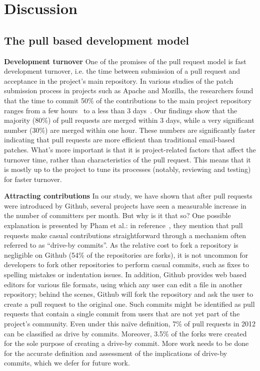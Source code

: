 \documentclass{acm_proc_article-sp}
\begin{document}

\section{Discussion}
\label{sec:discussion}

\subsection{The pull based development model}

\textbf{Development turnover} One of the promises of the pull request model
is fast development turnover, i.e. the time between submission of a pull
request and acceptance in the project's main repository. In various studies of
the patch submission process in projects such as Apache and Mozilla, the
researchers found that the time to commit 50\% of the contributions to the main
project repository ranges from a few hours~\cite{Rigby08} to a less than 3
days~\cite{Weiss08, Baysa12}. Our findings show that the majority (80\%) of
pull requests are merged within 3 days, while a very significant number (30\%)
are merged within one hour. These numbers are significantly faster indicating
that pull requests are more efficient than traditional email-based patches.
What's more important is that it is project-related factors that affect the
turnover time, rather than characteristics of the pull request. This means that
it is mostly up to the project to tune its processes (notably, reviewing and
testing) for faster turnover. 

\textbf{Attracting contributions}
In our study, we have shown that after pull requests were introduced
by Github, several projects have seen a measurable increase in the number
of committers per month. But why is it that so? One possible explanation
is presented by Pham et al.: in reference~\cite{Pham13}, they mention
that pull requests make casual contributions straightforward through
a mechanism often referred to as ``drive-by commits''. As the
relative cost to fork a repository is negligible on Github (54\% of the
repositories are forks), it is not uncommon for developers to fork other
repositories to perform casual commits, such as fixes to spelling mistakes or
indentation issues. In addition, Github provides web based editors
for various file formats, using which any user can edit a file in another
repository; behind the scenes, Github will fork the repository and ask the user
to create a pull request to the original one. Such commits might be identified
as pull requests that contain a single commit from users that are not yet part
of the project's community. Even under this na\"ive definition, 7\% of pull
requests in 2012 can be classified as drive by commits. Moreover, 3.5\% of the
forks were created for the sole purpose of creating a drive-by commit. More
work needs to be done for the accurate definition and assessment of the
implications of drive-by commits, which we defer for future work.
\end{document}
